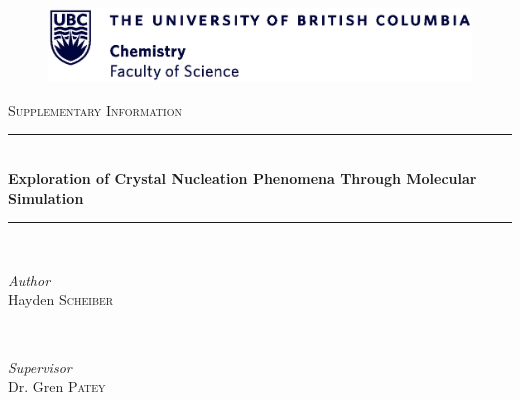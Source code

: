 \documentclass[titlepage,11pt]{article}
\begin{document}
\begin{titlepage} %
	\newcommand{\HRule}{\rule{\linewidth}{0.5mm}} %
	
	\center %
	\begin{figure}
		\centering
		\includegraphics[width=\textwidth]{figures/UBC_Chemlogo.eps}
	\end{figure}
	
	
	
	\textsc{\LARGE Supplementary Information}\\[1.5cm] %
	
	
	
	\HRule\\[0.4cm]
	
	{\huge\bfseries Exploration of Crystal Nucleation Phenomena Through Molecular Simulation}\\[0.4cm] %
	
	\HRule\\[1.5cm]
	
	
	\begin{minipage}{0.4\textwidth}
		\begin{flushleft}
			\large
			\textit{Author}\\
			Hayden \textsc{Scheiber} %
		\end{flushleft}
	\end{minipage}
	~
	\begin{minipage}{0.4\textwidth}
		\begin{flushright}
			\large
			\textit{Supervisor}\\
			Dr. Gren \textsc{Patey} %
		\end{flushright}
	\end{minipage}\\
	

\end{titlepage}
\end{document}
